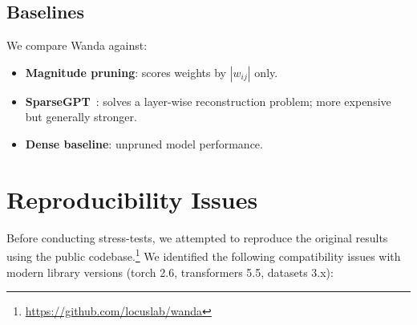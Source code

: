 \documentclass{article}
\begin{document}
\subsection{Baselines}

We compare Wanda against:
\begin{itemize}
  \item \textbf{Magnitude pruning}: scores weights by $|w_{ij}|$ only.
  \item \textbf{SparseGPT}~\cite{sparsegpt}: solves a layer-wise
        reconstruction problem; more expensive but generally stronger.
  \item \textbf{Dense baseline}: unpruned model performance.
\end{itemize}

\section{Reproducibility Issues}

Before conducting stress-tests, we attempted to reproduce the original results
using the public codebase.\footnote{\url{https://github.com/locuslab/wanda}}
We identified the following compatibility issues with modern library versions
(torch 2.6, transformers 5.5, datasets 3.x):
\end{document}
